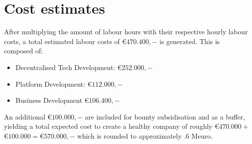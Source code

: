 \section{Cost estimates}
After multiplying the amount of labour hours with their respective hourly labour costs, a total estimated labour costs of \euro$470.400,-$ is generated. This is composed of:
\begin{itemize}
	\item Decentralised Tech Development: \euro$252.000,-$
	\item Platform Development: \euro$112.000,-$
	\item Business Development \euro$106.400,-$
\end{itemize}
An additional \euro$100.000,-$ are included for bounty subsidisation and as a buffer, yielding a total expected cost to create a healthy company of roughly \euro$470.000+$\euro$100.000=$\euro$570.000,-$ which is rounded to approximately .6 Meuro.
